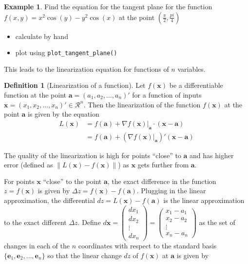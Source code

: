 \documentclass[
]{book}
\providecommand{\tightlist}{%
  \setlength{\itemsep}{0pt}\setlength{\parskip}{0pt}}
\theoremstyle{definition}
\newtheorem{definition}{Definition}[chapter]
\theoremstyle{definition}
\newtheorem{example}{Example}[chapter]
\theoremstyle{definition}
\theoremstyle{remark}
\begin{document}
\begin{example}
\protect\hypertarget{exm:unnamed-chunk-295}{}{\label{exm:unnamed-chunk-295} }Find the equation for the tangent plane for the function \(f(x, y) = x^2 \cos(y) - y^2 \cos(x)\) at the point \((\frac{\pi}{2}, \frac{pi}{4})\)

\begin{itemize}
\tightlist
\item
  calculate by hand
\item
  plot using \texttt{plot\_tangent\_plane()}
\end{itemize}
\end{example}

This leads to the linearization equation for functions of \(n\) variables.
\begin{definition}[Linearization of a function]
\protect\hypertarget{def:unnamed-chunk-296}{}{\label{def:unnamed-chunk-296} {} }Let \(f(\mathbf{x})\) be a differentiable function at the point \(\mathbf{a} = (a_1, a_2, \ldots, a_n)'\) for a function of inputs \(\mathbf{x} = (x_1, x_2, \ldots, x_n)' \in \mathcal{R}^n\). Then the linearization of the function \(f(\mathbf{x})\) at the point \(\mathbf{a}\) is given by the equation
\[
\begin{aligned}
L(\mathbf{x}) & = f(\mathbf{a}) + \nabla f(\mathbf{x}) |_{\mathbf{a}} \cdot (\mathbf{x} - \mathbf{a}) \\
& = f(\mathbf{a}) + \left( \nabla f(\mathbf{x}) |_{\mathbf{a}} \right)' (\mathbf{x} - \mathbf{a})
\end{aligned}
\]
\end{definition}
The quality of the linearization is high for points ``close'' to \(\mathbf{a}\) and has higher error (defined as \(\|L(\mathbf{x}) - f(\mathbf{x})\|\)) as \(\mathbf{x}\) gets further from \(\mathbf{a}\).

For points \(\mathbf{x}\) ``close'' to the point \(\mathbf{a}\), the exact difference in the function \(z = f(\mathbf{x})\) is given by \(\Delta z = f(\mathbf{x}) - f(\mathbf{a})\). Plugging in the linear approximation, the differential \(d z = L(\mathbf{x}) - f(\mathbf{a})\) is the linear approximation to the exact different \(\Delta z\). Define \(d \mathbf{x} = \begin{pmatrix} d x_1 \\ d x_2 \\ \vdots \\ d x_n \end{pmatrix} = \begin{pmatrix} x_1 - a_1 \\ x_2 - a_2 \\ \vdots \\ x_n - a_n \end{pmatrix}\) as the set of changes in each of the \(n\) coordinates with respect to the standard basis \(\{\mathbf{e}_1, \mathbf{e}_2, \ldots, \mathbf{e}_n\}\) so that the linear change \(d z\) of \(f(\mathbf{x})\) at \(\mathbf{a}\) is given by
\end{document}
